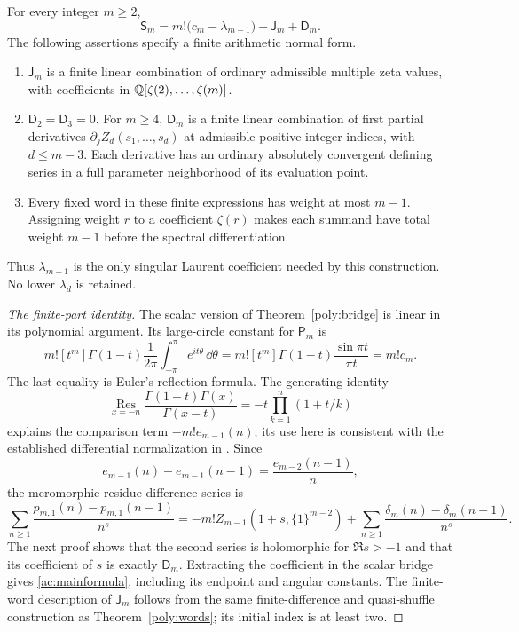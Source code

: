 \begin{theorem}
\label{ac:main}
For every integer $m\ge2$,
\begin{equation}\label{ac:mainformula}
 \boxed{\displaystyle
 \mathsf S_m=m!\bigl(c_m-\lambda_{m-1}\bigr)
                 +\mathsf J_m+\mathsf D_m.}
\end{equation}
The following assertions specify a finite arithmetic normal form.
\begin{enumerate}
 \item $\mathsf J_m$ is a finite linear combination of ordinary
 admissible multiple zeta values, with coefficients in
 $\mathbb Q[\zeta(2),\ldots,\zeta(m)]$.
 \item $\mathsf D_2=\mathsf D_3=0$. For $m\ge4$, $\mathsf D_m$
 is a finite linear combination of first partial derivatives
 $\partial_j Z_d(s_1,\ldots,s_d)$ at admissible positive-integer
 indices, with $d\le m-3$. Each derivative has an ordinary
 absolutely convergent defining series in a full parameter
 neighborhood of its evaluation point.
 \item Every fixed word in these finite expressions has weight
 at most $m-1$. Assigning weight $r$ to a coefficient $\zeta(r)$
 makes each summand have total weight $m-1$ before the spectral
 differentiation.
\end{enumerate}
Thus $\lambda_{m-1}$ is the only singular Laurent coefficient
needed by this construction. No lower $\lambda_d$ is retained.
\end{theorem}

\begin{proof}[The finite-part identity]
The scalar version of Theorem~\ref{poly:bridge} is linear in its
polynomial argument. Its large-circle constant for $\mathsf P_m$ is
\[
 m![t^m]\Gamma(1-t)\frac1{2\pi}
       \int_{-\pi}^{\pi}e^{it\theta}\,\dd\theta
 =m![t^m]\Gamma(1-t)\frac{\sin\pi t}{\pi t}
 =m!c_m.
\]
The last equality is Euler's reflection formula. The generating
identity
\[
 \operatorname*{Res}_{x=-n}
 \frac{\Gamma(1-t)\Gamma(x)}{\Gamma(x-t)}
       =-t\prod_{k=1}^n(1+t/k)
\]
explains the comparison term $-m!e_{m-1}(n)$; its use here is
consistent with the established differential normalization in
\cite{Fifth}. Since
\[
 e_{m-1}(n)-e_{m-1}(n-1)=\frac{e_{m-2}(n-1)}n,
\]
the meromorphic residue-difference series is
\begin{equation}\label{ac:Dsplit}
 \sum_{n\ge1}\frac{p_{m,1}(n)-p_{m,1}(n-1)}{n^s}
 =-m!Z_{m-1}(1+s,\{1\}^{m-2})
   +\sum_{n\ge1}\frac{\delta_m(n)-\delta_m(n-1)}{n^s}.
\end{equation}
The next proof shows that the second series is holomorphic for
$\Re s>-1$ and that its coefficient of $s$ is exactly
$\mathsf D_m$. Extracting the coefficient in the scalar bridge
gives \eqref{ac:mainformula}, including its endpoint and angular
constants. The finite-word description of $\mathsf J_m$ follows
from the same finite-difference and quasi-shuffle construction as
Theorem~\ref{poly:words}; its initial index is at least two.
\end{proof}

